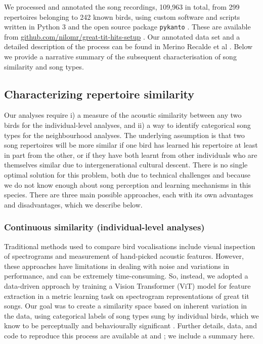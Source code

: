 \documentclass[9pt, onecolumn, twoside, lineno]{gsajnl}
\begin{document}
We processed and annotated the song recordings, 109,963 in total, from 299 repertoires belonging to 242 known birds, using custom software and scripts written in Python 3 \autocite{vanrossum1995} and the open source package \texttt{pykanto} \autocite{merinorecalde2023}. These are available from \href{https://github.com/nilomr/great-tit-hits-setup}{github.com/nilomr/great-tit-hits-setup} \autocite{nilo_gretidataset_setup_2023}. Our annotated data set and a detailed description of the process can be found in Merino Recalde et al \autocite{merinorecalde2024}. Below we provide a narrative summary of the subsequent characterisation of song similarity and song types.

\subsection{Characterizing repertoire similarity}

Our analyses require i) a measure of the acoustic similarity between any two birds for the individual-level analyses, and ii) a way to identify categorical song types for the neighbourhood analyses. The underlying assumption is that two song repertoires will be more similar if one bird has learned his repertoire at least in part from the other, or if they have both learnt from other individuals who are themselves similar due to intergenerational cultural descent. There is no single optimal solution for this problem, both due to technical challenges and because we do not know enough about song perception and learning mechanisms in this species. There are three main possible approaches, each with its own advantages and disadvantages, which we describe below.

\subsubsection{Continuous similarity (individual-level analyses)}
\label{sc:song-similarity}

Traditional methods used to compare bird vocalisations include visual inspection of spectrograms and measurement of hand-picked acoustic features. However, these approaches have limitations in dealing with noise and variations in performance, and can be extremely time-consuming. So, instead, we adopted a data-driven approach by training a Vision Transformer (ViT) model for feature extraction in a metric learning task on spectrogram representations of great tit songs. Our goal was to create a similarity space based on inherent variation in the data, using categorical labels of song types sung by individual birds, which we know to be perceptually and behaviourally significant \autocite{lind1996}. Further details, data, and code to reproduce this process are available at \autocite{merinorecalde2023} and \autocite{merinorecalde2024}; we include a summary here.
\end{document}
